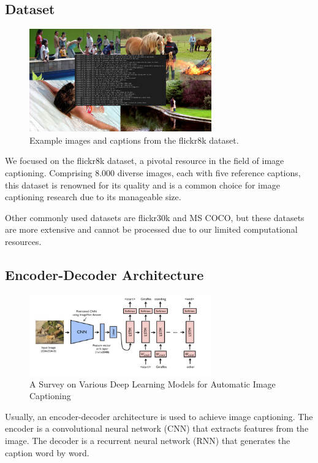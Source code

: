 \documentclass[12pt]{article}
\theoremstyle{plain}
\theoremstyle{definition}
\theoremstyle{remark}
\begin{document}
\subsection{Dataset}
\begin{figure}[H]
    \centering
    \includegraphics[width=0.7\textwidth]{res/flickr8k.png}
    \caption{Example images and captions from the flickr8k dataset.}
    \label{fig:flickr8k}
\end{figure}
We focused on the flickr8k dataset, a pivotal resource in the field of image captioning. Comprising 8.000 diverse images, each with five reference captions, this dataset is renowned for its quality and is a common choice for image captioning research due to its manageable size.
\par Other commonly used datasets are flickr30k and MS COCO, but these datasets are more extensive and cannot be processed due to our limited computational resources.

\subsection{Encoder-Decoder Architecture}
\begin{figure}[H]
    \centering
    \includegraphics[width=0.7\textwidth]{res/encoder-decoder.png}
    \caption{A Survey on Various Deep Learning Models for Automatic Image Captioning \cite{gaurav}}
    \label{fig:encoder-decoder}
\end{figure}
Usually, an encoder-decoder architecture is used to achieve image captioning. The encoder is a convolutional neural network (CNN) that extracts features from the image. The decoder is a recurrent neural network (RNN) that generates the caption word by word.
\end{document}
